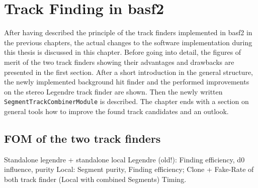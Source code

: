 \chapter{Track Finding in basf2} \label{chapter-workflow}

After having described the principle of the track finders implemented in basf2 in the previous chapters, the actual changes to the software implementation during this thesis is discussed in this chapter. Before going into detail, the figures of merit of the two track finders showing their advantages and drawbacks are presented in the first section. After a short introduction in the general structure, the newly implemented background hit finder and the performed improvements on the stereo Legendre track finder are shown. Then the newly written \texttt{SegmentTrackCombinerModule} is described. The chapter ends with a section on general tools how to improve the found track candidates and an outlook.


\section{FOM of the two track finders}

Standalone legendre + standalone local
Legendre (old!): Finding efficiency, d0 influence, purity
Local: Segment purity, Finding efficiency; Clone + Fake-Rate of both track finder (Local with combined Segments)
Timing.


